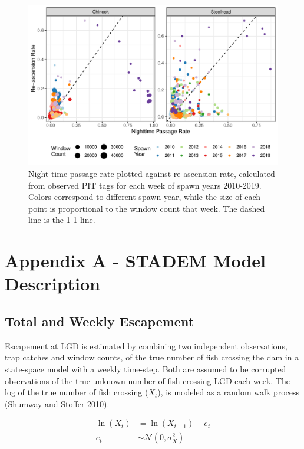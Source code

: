\documentclass[
  12pt,
]{article}
\begin{document}
\begin{figure}
\centering
\includegraphics{../figures/night-reasc-diff-fig-1.pdf}
\caption{\label{fig:night-reasc-diff-fig}Night-time passage rate plotted against re-ascension rate, calculated from observed PIT tags for each week of spawn years 2010-2019. Colors correspond to different spawn year, while the size of each point is proportional to the window count that week. The dashed line is the 1-1 line.}
\end{figure}

\newpage

\hypertarget{append1}{%
\section{Appendix A - STADEM Model Description}\label{append1}}

\hypertarget{total-and-weekly-escapement}{%
\subsection{Total and Weekly Escapement}\label{total-and-weekly-escapement}}

Escapement at LGD is estimated by combining two independent observations, trap catches and window counts, of the true number of fish crossing the dam in a state-space model with a weekly time-step. Both are assumed to be corrupted observations of the true unknown number of fish crossing LGD each week. The log of the true number of fish crossing (\(X_t\)), is modeled as a random walk process (Shumway and Stoffer 2010).

\[
\begin{aligned}
  \ln \left( X_{t} \right) &= \ln \left( X_{t-1} \right) + e_t \\
  e_t &\sim \mathcal{N}(0, \sigma^2_X)
\end{aligned}
\]
\end{document}
